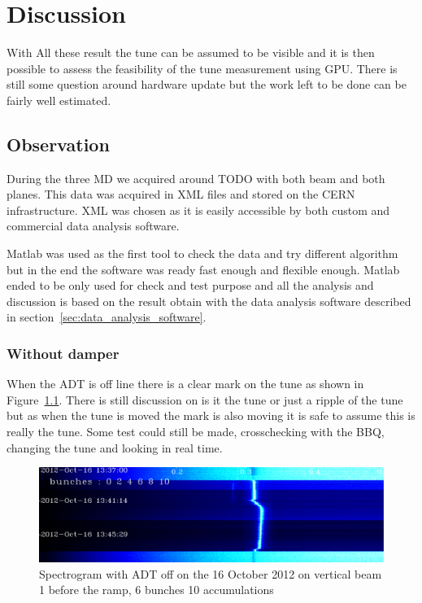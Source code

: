 
\chapter{Discussion}

With All these result the tune can be assumed to be visible and it is then possible to assess the feasibility of the tune measurement using \gls{GPU}. There is still some question around hardware update but the work left to be done can be fairly well estimated.

\section{Observation}

During the three \gls{MD} we acquired around TODO with both beam and both planes. This data was acquired in XML files and stored on the \gls{CERN} infrastructure. XML was chosen as it is easily accessible by both custom and commercial data analysis software.

Matlab was used as the first tool to check the data and try different algorithm but in the end the software was ready fast enough and flexible enough. Matlab ended to be only used for check and test purpose and all the analysis and discussion is based on the result obtain with the data analysis software described in section~\ref{sec:data_analysis_software}.

	\subsection{Without damper}

	When the \gls{ADT} is off line there is a clear mark on the tune as shown in Figure~\ref{fig:adt_off}. There is still discussion on is it the tune or just a ripple of the tune but as when the tune is moved the mark is also moving it is safe to assume this is really the tune. Some test could still be made, crosschecking with the \gls{BBQ}, changing the tune and looking in real time.

	\begin{figure}[H]
	\caption{Spectrogram with ADT off on the 16 October 2012 on vertical beam 1 before the ramp, 6 bunches 10 accumulations}
	\label{fig:adt_off}
	\centering
	\includegraphics[scale=0.3]{md-121016-vb1-m1-6bunches-10acc-1337-1349-ADT-off.pdf}
	\end{figure}


